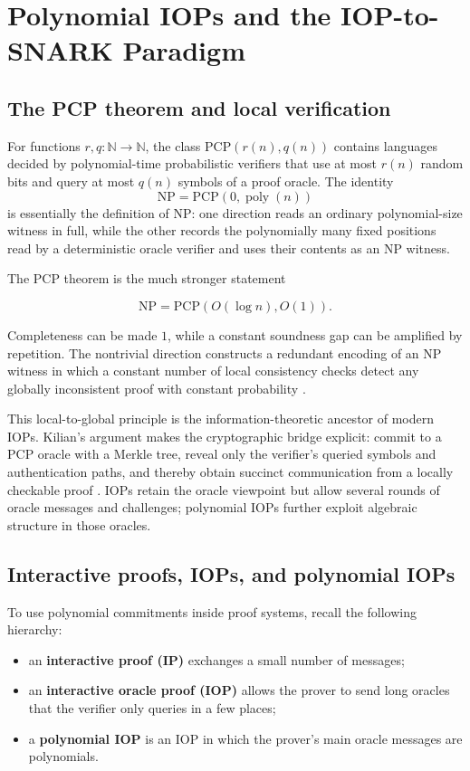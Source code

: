 \section{Polynomial IOPs and the IOP-to-SNARK Paradigm}

\subsection{The PCP theorem and local verification}

For functions $r,q:\mathbb{N}\to\mathbb{N}$, the class $\mathrm{PCP}(r(n),q(n))$ contains languages decided by polynomial-time probabilistic verifiers that use at most $r(n)$ random bits and query at most $q(n)$ symbols of a proof oracle. The identity
\[
\mathrm{NP}=\mathrm{PCP}(0,\operatorname{poly}(n))
\]
is essentially the definition of NP: one direction reads an ordinary polynomial-size witness in full, while the other records the polynomially many fixed positions read by a deterministic oracle verifier and uses their contents as an NP witness.

The PCP theorem is the much stronger statement
\begin{tcolorbox}
\[
\mathrm{NP}=\mathrm{PCP}(O(\log n),O(1)).
\]
\end{tcolorbox}
Completeness can be made $1$, while a constant soundness gap can be amplified by repetition. The nontrivial direction constructs a redundant encoding of an NP witness in which a constant number of local consistency checks detect any globally inconsistent proof with constant probability \cite{AroraSafra1998,AroraLundMotwaniSudanSzegedy1998}.

This local-to-global principle is the information-theoretic ancestor of modern IOPs. Kilian's argument makes the cryptographic bridge explicit: commit to a PCP oracle with a Merkle tree, reveal only the verifier's queried symbols and authentication paths, and thereby obtain succinct communication from a locally checkable proof \cite{Kilian1992}. IOPs retain the oracle viewpoint but allow several rounds of oracle messages and challenges; polynomial IOPs further exploit algebraic structure in those oracles.

\subsection{Interactive proofs, IOPs, and polynomial IOPs}

To use polynomial commitments inside proof systems, recall the following hierarchy:
\begin{itemize}[leftmargin=2em]
    \item an \textbf{interactive proof (IP)} exchanges a small number of messages;
    \item an \textbf{interactive oracle proof (IOP)} allows the prover to send long oracles that the verifier only queries in a few places;
    \item a \textbf{polynomial IOP} is an IOP in which the prover's main oracle messages are polynomials.
\end{itemize}

